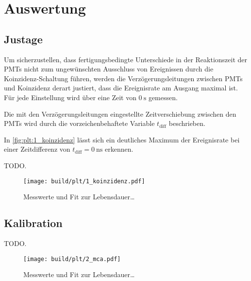 \section{Auswertung}
\label{sec:auswertung}

\subsection{Justage}
Um sicherzustellen,
dass fertigungsbedingte Unterschiede in der Reaktionszeit der \acp{PMT}
nicht zum ungewünschten Ausschluss von Ereignissen durch die Koinzidenz-Schaltung führen,
werden die Verzögerungsleitungen zwischen \acp{PMT} und Koinzidenz derart justiert,
dass die Ereignisrate am Ausgang maximal ist.
Für jede Einstellung wird über eine Zeit von $\SI{0}{\second}$ gemessen.

Die mit den Verzögerungsleitungen eingestellte Zeitverschiebung zwischen den \acp{PMT}
wird durch die vorzeichenbehaftete Variable $t_\text{diff}$ beschrieben.

In \autoref{fig:plt:1_koinzidenz} lässt sich ein deutliches Maximum der Ereignisrate
bei einer Zeitdifferenz von $t_\text{diff} = \SI{0}{\nano\second}$ erkennen.

\begin{table}
    \centering
    \caption{TODO.}
    \label{tab:1_koinzidenz}
\end{table}

\begin{figure}
    \centering
    \texttt{[image: build/plt/1\_koinzidenz.pdf]}
    \caption{Messwerte und Fit zur Lebensdauer…}
    \label{fig:plt:1_koinzidenz}
\end{figure}

\subsection{Kalibration}
\begin{table}
    \centering
    \caption{TODO.}
    \label{tab:2_mca}
\end{table}

\begin{figure}
    \centering
    \texttt{[image: build/plt/2\_mca.pdf]}
    \caption{Messwerte und Fit zur Lebensdauer…}
    \label{fig:plt:2_mca}
\end{figure}


